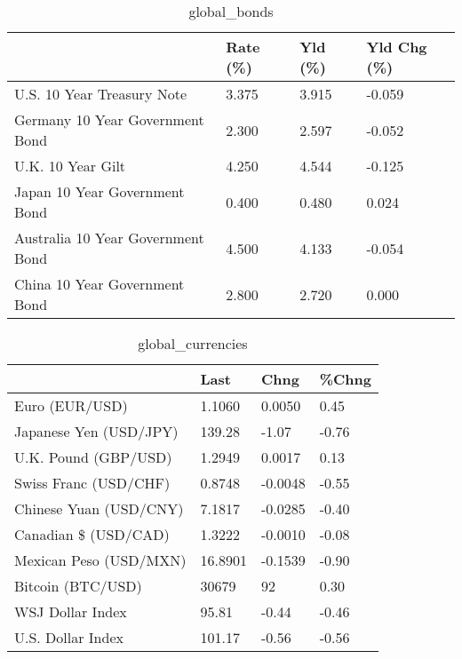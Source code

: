 \documentclass{article}%
\begin{document}
%


\begin{table}[htbp]%
\caption{global\_bonds}%
\centering%
\begin{adjustbox}{width=1\textwidth}%
\begin{tabular}{llll}
\toprule
                                  & Rate (\%) & Yld (\%) & Yld Chg (\%) \\
\midrule
       U.S. 10 Year Treasury Note &    3.375 &   3.915 &      -0.059 \\
  Germany 10 Year Government Bond &    2.300 &   2.597 &      -0.052 \\
                U.K. 10 Year Gilt &    4.250 &   4.544 &      -0.125 \\
    Japan 10 Year Government Bond &    0.400 &   0.480 &       0.024 \\
Australia 10 Year Government Bond &    4.500 &   4.133 &      -0.054 \\
    China 10 Year Government Bond &    2.800 &   2.720 &       0.000 \\
\bottomrule
\end{tabular}
%
\end{adjustbox}%
\end{table}

%


\begin{table}[htbp]%
\caption{global\_currencies}%
\centering%
\begin{adjustbox}{width=1\textwidth}%
\begin{tabular}{llll}
\toprule
                       &    Last &    Chng & \%Chng \\
\midrule
        Euro (EUR/USD) &  1.1060 &  0.0050 &  0.45 \\
Japanese Yen (USD/JPY) &  139.28 &   -1.07 & -0.76 \\
  U.K. Pound (GBP/USD) &  1.2949 &  0.0017 &  0.13 \\
 Swiss Franc (USD/CHF) &  0.8748 & -0.0048 & -0.55 \\
Chinese Yuan (USD/CNY) &  7.1817 & -0.0285 & -0.40 \\
  Canadian \$ (USD/CAD) &  1.3222 & -0.0010 & -0.08 \\
Mexican Peso (USD/MXN) & 16.8901 & -0.1539 & -0.90 \\
     Bitcoin (BTC/USD) &   30679 &      92 &  0.30 \\
      WSJ Dollar Index &   95.81 &   -0.44 & -0.46 \\
     U.S. Dollar Index &  101.17 &   -0.56 & -0.56 \\
\bottomrule
\end{tabular}
%
\end{adjustbox}%
\end{table}
\end{document}
